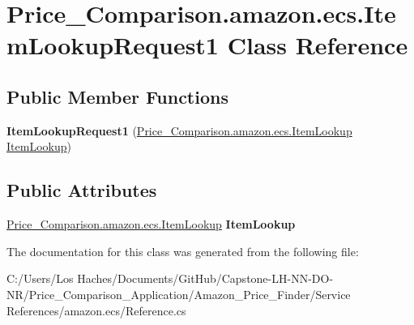 \hypertarget{class_price___comparison_1_1amazon_1_1ecs_1_1_item_lookup_request1}{\section{Price\-\_\-\-Comparison.\-amazon.\-ecs.\-Item\-Lookup\-Request1 Class Reference}
\label{class_price___comparison_1_1amazon_1_1ecs_1_1_item_lookup_request1}
}
\subsection*{Public Member Functions}
\begin{DoxyCompactItemize}
\item 
\hypertarget{class_price___comparison_1_1amazon_1_1ecs_1_1_item_lookup_request1_a17f827c1950c7f39dd6ce9baa6bfdd3f}{{\bfseries Item\-Lookup\-Request1} (\hyperlink{class_price___comparison_1_1amazon_1_1ecs_1_1_item_lookup}{Price\-\_\-\-Comparison.\-amazon.\-ecs.\-Item\-Lookup} \hyperlink{class_price___comparison_1_1amazon_1_1ecs_1_1_item_lookup}{Item\-Lookup})}\label{class_price___comparison_1_1amazon_1_1ecs_1_1_item_lookup_request1_a17f827c1950c7f39dd6ce9baa6bfdd3f}

\end{DoxyCompactItemize}
\subsection*{Public Attributes}
\begin{DoxyCompactItemize}
\item 
\hypertarget{class_price___comparison_1_1amazon_1_1ecs_1_1_item_lookup_request1_a6503e091f2f3e52b213fa54576034a2b}{\hyperlink{class_price___comparison_1_1amazon_1_1ecs_1_1_item_lookup}{Price\-\_\-\-Comparison.\-amazon.\-ecs.\-Item\-Lookup} {\bfseries Item\-Lookup}}\label{class_price___comparison_1_1amazon_1_1ecs_1_1_item_lookup_request1_a6503e091f2f3e52b213fa54576034a2b}

\end{DoxyCompactItemize}


The documentation for this class was generated from the following file\-:\begin{DoxyCompactItemize}
\item 
C\-:/\-Users/\-Los Haches/\-Documents/\-Git\-Hub/\-Capstone-\/\-L\-H-\/\-N\-N-\/\-D\-O-\/\-N\-R/\-Price\-\_\-\-Comparison\-\_\-\-Application/\-Amazon\-\_\-\-Price\-\_\-\-Finder/\-Service References/amazon.\-ecs/Reference.\-cs\end{DoxyCompactItemize}
